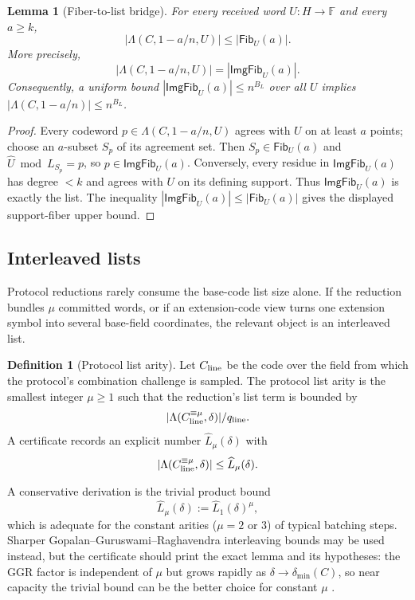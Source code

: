 \documentclass[11pt]{article}
\newtheorem{lemma}[theorem]{Lemma}
\theoremstyle{definition}
\newtheorem{definition}[theorem]{Definition}
\newcommand{\F}{\mathbb F}
\newcommand{\qline}{q_{\rm line}}
\newcommand{\Fib}{\mathsf{Fib}}
\newcommand{\ImgFib}{\mathsf{ImgFib}}
\newcommand{\Int}[2]{#1^{\equiv #2}}
\begin{document}
\begin{lemma}[Fiber-to-list bridge]
\label{lem:fiber-list}
For every received word $U:H\to\F$ and every $a\ge k$,
\[
        |\Lambda(C,1-a/n,U)|\le |\Fib_U(a)| .
\]
More precisely,
\[
        |\Lambda(C,1-a/n,U)|=|\ImgFib_U(a)|.
\]
Consequently, a uniform bound $|\ImgFib_U(a)|\le n^{B_L}$ over all $U$ implies $|\Lambda(C,1-a/n)|\le n^{B_L}$.
\end{lemma}

\begin{proof}
Every codeword $p\in\Lambda(C,1-a/n,U)$ agrees with $U$ on at least $a$ points;
choose an $a$-subset $S_p$ of its agreement set.  Then $S_p\in\Fib_U(a)$ and
$\widehat U\bmod L_{S_p}=p$, so $p\in\ImgFib_U(a)$.  Conversely, every residue
in $\ImgFib_U(a)$ has degree $<k$ and agrees with $U$ on its defining support.
Thus $\ImgFib_U(a)$ is exactly the list.  The inequality
$|\ImgFib_U(a)|\le|\Fib_U(a)|$ gives the displayed support-fiber upper bound.
\end{proof}

\subsection{Interleaved lists}
\label{sec:interleaved}

Protocol reductions rarely consume the base-code list size alone.  If the reduction bundles $\mu$ committed words, or if an extension-code view turns one extension symbol into several base-field coordinates, the relevant object is an interleaved list.

\begin{definition}[Protocol list arity]
\label{def:list-arity}
Let $C_{\rm line}$ be the code over the field from which the protocol's combination challenge is sampled.  The protocol list arity is the smallest integer $\mu\ge1$ such that the reduction's list term is bounded by
\[
        |\Lambda(\Int{C_{\rm line}}{\mu},\delta)|/\qline .
\]
A certificate records an explicit number $\widehat L_{\mu}(\delta)$ with
\[
        |\Lambda(\Int{C_{\rm line}}{\mu},\delta)|
        \le \widehat L_{\mu}(\delta).
\]
\end{definition}

A conservative derivation is the trivial product bound
\begin{equation}
\label{eq:trivial-interleaving}
        \widehat L_{\mu}(\delta)
        :=\widehat L_1(\delta)^{\mu},
\end{equation}
which is adequate for the constant arities ($\mu=2$ or $3$) of typical batching steps.  Sharper Gopalan--Guruswami--Raghavendra interleaving bounds may be used instead, but the certificate should print the exact lemma and its hypotheses: the GGR factor is independent of $\mu$ but grows rapidly as $\delta\to\delta_{\min}(C)$, so near capacity the trivial bound can be the better choice for constant $\mu$ \cite{GGR11,ABF26}.
\end{document}
